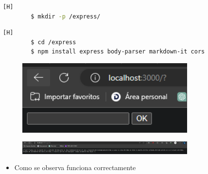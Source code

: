 \documentclass{article}
\begin{document}
	\begin{lstlisting}[language=bash,caption={Crear subcarpeta para instalar frameworks}][H]
		$ mkdir -p /express/
	\end{lstlisting}
	\begin{lstlisting}[language=bash,caption={Instalar frameworks dentro de express}][H]
		$ cd /express
		$ npm install express body-parser markdown-it cors
	\end{lstlisting}	
	\begin{figure}[H]
		\centering
		\includegraphics[width=0.8\textwidth,keepaspectratio]{img/localhost01.png}
	\end{figure}
	\begin{figure}[H]
		\centering
		\includegraphics[width=0.8\textwidth,keepaspectratio]{img/localhost_agenda.png}
	\end{figure}
	\begin{itemize}	
		\item Como se observa funciona correctamente
	\end{itemize}
\end{document}
